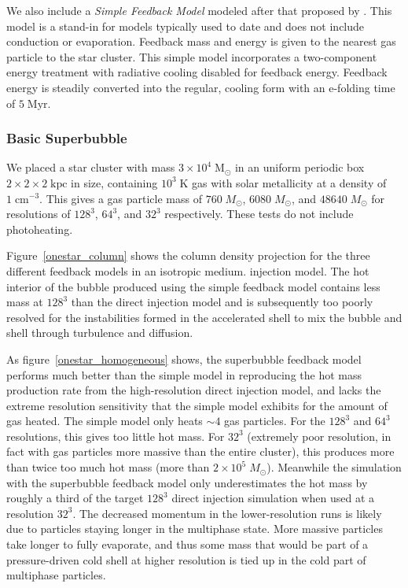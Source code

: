 We also include a {\it Simple Feedback
Model} modeled after that proposed by \citet{Agertz2013}.  This model is a
stand-in for models typically used to date and does not include conduction or
evaporation.  Feedback mass and energy is given to the nearest gas particle to
the star cluster.  This simple model incorporates a two-component energy
treatment with radiative cooling disabled for feedback energy.  Feedback energy
is steadily converted into the regular, cooling form with an e-folding time of
$5\;\mathrm{Myr}$. 

\subsubsection{Basic Superbubble}

We placed a star cluster with mass $3\times10^4\;\mathrm{M_\odot}$ in an uniform
periodic box $2\times2\times2\;\mathrm{kpc}$ in size, containing
$10^3\;\mathrm{K}$ gas with solar metallicity at a density of
$1\;\mathrm{cm^{-3}}$.   This gives a gas particle mass of $760\; M_\odot$,
$6080\; M_\odot$, and $48640\; M_\odot$ for resolutions of $128^3$, $64^3$, and
$32^3$ respectively.  These tests do not include photoheating. 

Figure~\ref{onestar_column} shows the column density projection for the three
different feedback models in an isotropic medium.  injection model.   The hot
interior of the bubble produced using the simple feedback model contains less
mass at $128^3$ than the direct injection model and is subsequently too poorly
resolved for the instabilities formed in the accelerated shell
\citep{Vishniac1983} to mix the bubble and shell through turbulence and
diffusion.

As figure~\ref{onestar_homogeneous} shows, the superbubble feedback model
performs much better than the simple model in reproducing the hot mass
production rate from the high-resolution direct injection model, and lacks the
extreme resolution sensitivity that the simple model exhibits for the amount of
gas heated. The simple model only heats $\sim 4$ gas particles.  For the $128^3$
and $64^3$ resolutions, this gives too little hot mass.  For $32^3$ (extremely
poor resolution, in fact with gas particles more massive than the entire
cluster), this produces more than twice too much hot mass (more than
$2\times10^5\;M_\odot$). Meanwhile the simulation with the superbubble feedback
model only underestimates the hot mass by roughly a third of the target $128^3$
direct injection simulation when used at a resolution $32^3$.  The decreased
momentum in the lower-resolution runs is likely due to particles staying longer
in the multiphase state.  More massive particles take longer to fully evaporate,
and thus some mass that would be part of a pressure-driven cold shell at higher
resolution is tied up in the cold part of multiphase particles.

